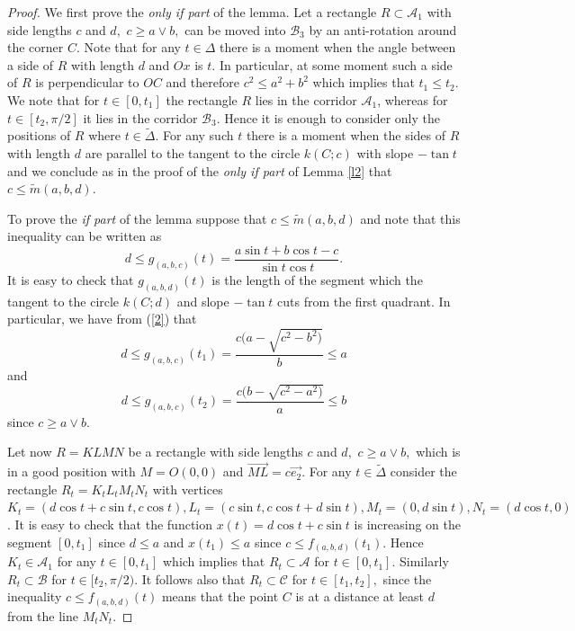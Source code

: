 \documentclass[10pt,a4paper]{amsart}
\def\A{\mathcal A}
\def\B{\mathcal B}
\def\C{\mathcal C}
\def\DD{\Delta}
\def\ss{\subset}
\begin{document}
\begin{proof}
We first prove the \emph{only if part} of the lemma. Let a
rectangle $R\ss \A_1$ with side lengths $c$ and $d,$ $c\ge a\vee
b,$ can be moved into $\B_3$ by an anti-rotation around the corner
$C$. Note that for any $t\in \DD$ there is a moment when the angle
between a side of $R$ with length $d$ and $Ox$ is $t$. In
particular, at some moment such a side of $R$ is perpendicular to
$OC$ and therefore $c^2\le a^2+b^2$ which implies that $t_1\le
t_2$. We note that for $t\in [0,t_1]$ the rectangle $R$ lies in
the corridor $\A_1$, whereas for $t\in [t_2,\pi/2]$ it lies in the
corridor $\B_3$. Hence it is enough to consider only the positions
of $R$ where $t\in \widetilde{\DD}$. For any such $t$ there is a
moment when the sides of $R$ with length $d$ are parallel to the
tangent to the circle $k(C;c)$ with slope $-\tan t$ and we
conclude as in the proof of the \emph{only if part} of Lemma
\ref{l2} that $c\le \widetilde{m}(a,b,d)$.

To prove the \emph{if part } of the lemma suppose that $c\le
\widetilde{m}(a,b,d)$ and note that this inequality can be written
as
\begin{equation}\label{2}
d\le g_{(a,b,c)}(t)=\frac{a\sin t+b\cos t-c}{\sin t\cos t} .
\end{equation}
It is easy to check that $g_{(a,b,d)}(t)$ is the length of the
segment which the tangent to the circle $k(C;d)$ and slope $-\tan
t$ cuts from the first quadrant. In particular, we have from
(\ref{2}) that
$$ d\le g_{(a,b,c)}(t_1)=\frac{c(a-\sqrt{c^2-b^2)}}{b}\leq a $$
and
$$ d\le g_{(a,b,c)}(t_2)=\frac{c(b-\sqrt{c^2-a^2)}}{a}\leq b $$
since $c\ge a\vee b .$

Let now $R=KLMN$ be a rectangle with side lengths $c$ and $d,$
$c\ge a\vee b,$ which is in a good position with $M=O(0,0)$ and
$\overrightarrow{ML} = c\overrightarrow{e_2} $. For any $t\in
\widetilde{\DD}$ consider the rectangle $R_t=K_tL_tM_tN_t$ with
vertices $K_t=(d\cos t+c\sin t, c\cos t) , L_t=(c\sin t, c\cos
t+d\sin t) , M_t=(0,d\sin t) , N_t=(d\cos t,0) $. It is easy to
check that the function $x(t)=d\cos t+c\sin t$ is increasing on
the segment $[0,t_1]$ since $d\le a$ and $x(t_1)\le a $ since
$c\le f_{(a,b,d)}(t_1)$. Hence $K_t\in \A_1$ for any $t\in
[0,t_1]$ which implies that $R_t \ss \A$ for $t\in [0,t_1]$.
Similarly $R_t \ss \B$ for $t\in [t_2, \pi/2)$. It follows also
that $R_t \ss \C$ for $t\in [t_1,t_2],$ since the inequality $c\le
f_{(a,b,d)}(t) $ means that the point $C$ is at a distance at
least $d$ from the line $M_tN_t$.
\end{proof}
\end{document}
